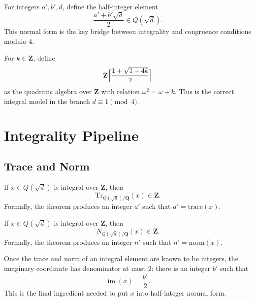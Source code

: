 \begin{definition}\label{def:halfint}%
\leanok
For integers $a', b', d$, define the half-integer element
\[
  \frac{a' + b' \sqrt d}{2} \in Q(\sqrt d).
\]
This normal form is the key bridge between integrality and congruence conditions
modulo $4$.
\end{definition}

\begin{definition}\label{def:zomega}%
\leanok
For $k \in \mathbf{Z}$, define
\[
  \mathbf{Z}\Bigl[\frac{1 + \sqrt{1+4k}}{2}\Bigr]
\]
as the quadratic algebra over $\mathbf{Z}$ with relation $\omega^2 = \omega + k$.
This is the correct integral model in the branch $d \equiv 1 \pmod 4$.
\end{definition}

\chapter{Integrality Pipeline}

\section{Trace and Norm}

\begin{lemma}\label{lem:int-trace}%
\leanok
If $x \in Q(\sqrt d)$ is integral over\/ $\mathbf{Z}$, then
\[
  \mathrm{Tr}_{Q(\sqrt d)/\mathbf{Q}}(x) \in \mathbf{Z}.
\]
Formally, the theorem produces an integer $a'$ such that
$a' = \mathrm{trace}(x)$.
\end{lemma}

\begin{lemma}\label{lem:int-norm}%
\leanok
If $x \in Q(\sqrt d)$ is integral over\/ $\mathbf{Z}$, then
\[
  N_{Q(\sqrt d)/\mathbf{Q}}(x) \in \mathbf{Z}.
\]
Formally, the theorem produces an integer $n'$ such that
$n' = \mathrm{norm}(x)$.
\end{lemma}

\begin{lemma}\label{lem:int-double-im}%
\leanok
Once the trace and norm of an integral element are known to be integers, the
imaginary coordinate has denominator at most $2$: there is an integer $b'$ such
that
\[
  \operatorname{im}(x) = \frac{b'}{2}.
\]
This is the final ingredient needed to put $x$ into half-integer normal form.
\end{lemma}

